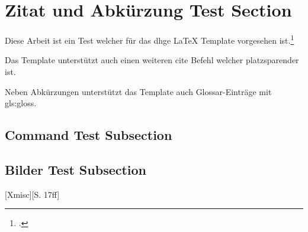 \section{Zitat und Abkürzung Test Section}

Diese Arbeit ist ein Test welcher f\"ur das \gls{dhge} LaTeX Template vorgesehen ist.\footcite{Xmisc}

Das Template unterstützt auch einen weiteren cite Befehl welcher platzsparender ist.\supercite{Xmisc}

Neben Abkürzungen unterstützt das Template auch Glossar-Einträge mit \gls{gls:gloss}.

\cleardoublepage

\subsection{Command Test Subsection}

\doubleunderline{$150\mathrm{\Omega}$}

\subsection{Bilder Test Subsection}

[Xmisc][S. 17ff]
